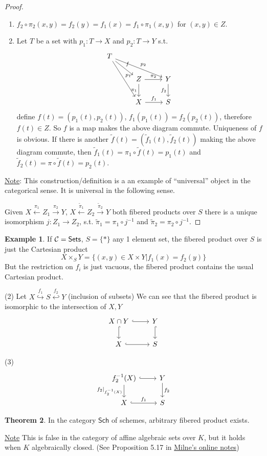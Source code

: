 \documentclass[11pt]{article}
\theoremstyle{definition}
\newtheorem{thm}{Theorem}[section]
\newtheorem{ex}[thm]{Example}
\newcommand{\calc}{{\cal C}}
\newcommand{\lrta}{\longrightarrow}
\newcommand{\inj}{\hookrightarrow}
\begin{document}
\begin{proof}
\ \begin{enumerate}[label=(\arabic*)]
\item $f_2\circ \pi_2(x,y)=f_2(y)=f_1(x)=f_1\circ \pi_1(x,y)$ for $(x,y)\in Z$.
\item Let $T$ be a set with $p_1:T\lrta X$ and $p_2:T\lrta Y$ s.t. $$\begin{tikzcd}
T \arrow[rdd,"p_1"] \arrow[rrd,"p_2"] \ar[rd,"f"] &  &  \\
 & Z \arrow[r, "\pi_2"] \arrow[d, "\pi_1"'] & Y \arrow[d, "f_2"'] \\
 & X \arrow[r, "f_1"] & S
\end{tikzcd}$$
define $f(t)=(p_1(t),p_2(t))$, $f_1(p_1(t))=f_2(p_2(t))$, therefore $f(t)\in Z$. So $f$ is a map makes the  above diagram commute. Uniqueness of $f$ is obvious. If there is  another $\tilde{f}(t)=(\tilde{f}_1(t),\tilde{f}_2(t))$ making the above diagram commute, then $\tilde{f}_1(t)=\pi_1\circ \tilde{f}(t)=p_1(t)$ and $\tilde{f}_2(t)=\pi\circ \tilde{f}(t)=p_2(t)$.
\end{enumerate}
\underline{Note}: This construction/definition is a an example of ``universal'' object in the categorical sense. It is universal in the following sense.

Given $X\overset{\pi_1}{\longleftarrow}Z_1\overset{\pi_2}{\lrta} Y$, $X\overset{\tilde{\pi}_1}{\longleftarrow}Z_2\overset{\tilde{\pi}_2}{\lrta} Y$ both fibered products over $S$ there is a unique isomorphism $j:Z_1\lrta Z_2$, s.t. $\tilde{\pi}_1=\pi_1\circ j^{-1}$ and $\tilde{\pi}_2=\pi_2\circ j^{-1}$.
\end{proof}
\begin{ex}
If $\calc=\mathsf{Sets}$, $S=\{*\}$ any 1 element set, the fibered product over $S$ is just the Cartesian product
$$
X\times_S Y=\{(x,y)\in X\times Y|f_1(x)=f_2(y)\}
$$
But the restriction on $f_i$ is just vacuous, the fibered product contains the usual Cartesian product.

(2) Let $X\overset{f_1}{\inj}S \overset{f_2}{\hookleftarrow} Y$ (inclusion of subsets) We can see that the fibered product is isomorphic to the intersection of $X,Y$
$$
\begin{tikzcd}
X\cap Y \arrow[d, hook] \arrow[r, hook] & Y \arrow[d, hook] \\
X \arrow[r, hook] & S
\end{tikzcd}
$$

(3) $$
\begin{tikzcd}
f_2^{-1}(X) \arrow[d, "f_2|_{f^{-1}_2(X)}"'] \arrow[r, hook] & Y \arrow[d, "f_2"] \\
X \arrow[r, "f_1", hook] & S
\end{tikzcd}
$$
\end{ex}
\begin{thm}
In the category $\mathsf{Sch}$ of schemes, arbitrary fibered product exists.
\end{thm}
\underline{Note} This is false in the category of affine algebraic sets over $K$, but it holds when $K$ algebraically closed. (See Proposition 5.17 in \href{http://www.jmilne.org/math/CourseNotes/AG.pdf}{Milne's online notes})
\end{document}
